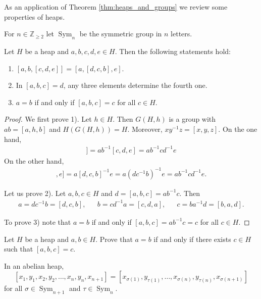 \documentclass[graybox]{svmult}
\newcommand{\Z}{\mathbb{Z}}
\newcommand{\Sym}{\operatorname{Sym}}
\begin{document}
As an application of Theorem \ref{thm:heaps_and_groups}
we review some properties of heaps. 

For $n\in\Z_{\geq2}$ let 
$\Sym_n$ be the symmetric group in $n$ letters. 

\begin{theorem}
Let $H$ be a heap and $a,b,c,d,e\in H$. Then the following statements hold:
\begin{enumerate}
    \item $[a,b,[c,d,e]]=[a,[d,c,b],e]$.
    \item In $[a,b,c]=d$, any three elements determine the fourth one. 
    \item $a=b$ if and only 
        if $[a,b,c]=c$ for all $c\in H$. 
\end{enumerate}
\end{theorem}

\begin{proof}
We first prove 1). Let $h\in H$. Then $G(H,h)$ is a group
with $ab=[a,h,b]$ and $H(G(H,h))=H$. Moreover, 
$xy^{-1}z=[x,y,z]$. On the one hand, 
\begin{align*}
    [a,b,[c,d,e]]=ab^{-1}[c,d,e]=ab^{-1}cd^{-1}e
\end{align*}
On the other hand,
\begin{align*}
    [a,[d,c,b],e]=a[d,c,b]^{-1}e=a(dc^{-1}b)^{-1}e=ab^{-1}cd^{-1}e.
\end{align*}

Let us prove 2). Let $a,b,c\in H$ and $d=[a,b,c]=ab^{-1}c$.
Then
\begin{align}
\label{eq:Iknow3}
a=dc^{-1}b=[d,c,b],
&&
b=cd^{-1}a=[c,d,a],
&&
c=ba^{-1}d=[b,a,d].
\end{align}

To prove 3) note that 
$a=b$ if and only if $[a,b,c]=ab^{-1}c=c$ for all $c\in H$.
\end{proof}

\begin{exercise}
    Let $H$ be a heap and $a,b\in H$. Prove that
    $a=b$ if and only if there exists $c\in H$ such that 
    $[a,b,c]=c$.
\end{exercise}


\begin{exercise}
    In an abelian heap,
    \[
    [x_1,y_1,x_2,y_2,\dots,x_n,y_n,x_{n+1}]=[x_{\sigma(1)},y_{\tau(1)},\dots,x_{\sigma(n)},y_{\tau(n)},x_{\sigma(n+1)}]
    \]
    for all $\sigma\in\Sym_{n+1}$ and $\tau\in\Sym_n$. 
\end{exercise}
\end{document}
